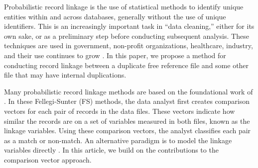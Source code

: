 \documentclass[12pt,letterpaper]{article}
\newcommand{\1}[1]{\mathbb{I}\!\left[#1\right]} %
\begin{document}

Probabilistic record linkage is the use of statistical methods to identify unique entities within and across databases, generally without the use of unique identifiers. This is an increasingly important task in ``data cleaning,'' either for its own sake, or as a preliminary step before conducting subsequent analysis. These techniques are used in government, non-profit organizations, healthcare, industry, and their use continues to grow \citep[e.g.,][]{Herzog_2007, christen_data_2012, Papadakis2021, binette2022almost}. In this paper, we propose a method for conducting record linkage between a duplicate free reference file and some other file that may have internal duplications. 


Many probabilistic record linkage methods are based on the foundational work of \cite{fellegi_theory_1969}. In these Fellegi-Sunter (FS) methods, the data analyst first creates comparison vectors for each pair of records in the data files. These vectors indicate how similar the records are on a set of variables measured in both files, known as the linkage variables.  Using these comparison vectors, the analyst classifies each pair as a match or non-match. An alternative paradigm is to model the linkage variables directly \citep[e.g.,][]{Tancredi_2011, steorts_bayesian_2016, marchant_d-blink_2019, betancourt2022prior}. In this article, we build on the contributions to the comparison vector approach.
\end{document}
